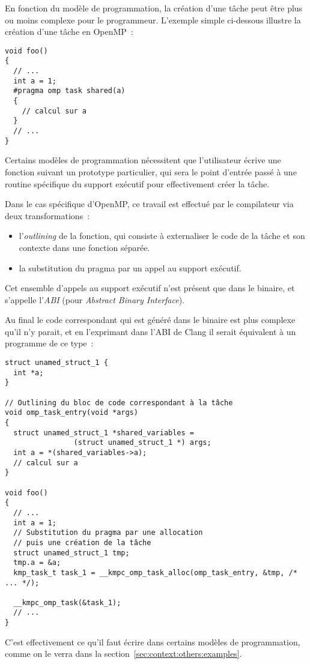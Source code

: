 En fonction du modèle de programmation, la création d'une tâche peut être plus ou moins complexe pour le programmeur.
L'exemple simple ci-dessous illustre la création d'une tâche en OpenMP~:
\begin{lstlisting}
void foo()
{
  // ...
  int a = 1;
  #pragma omp task shared(a)
  {
    // calcul sur a
  }
  // ...
}
\end{lstlisting}

Certains modèles de programmation nécessitent que l'utilisateur écrive une fonction suivant un prototype particulier, qui sera le point d'entrée passé à une routine spécifique du support exécutif pour effectivement créer la tâche.

Dans le cas spécifique d'OpenMP, ce travail est effectué par le compilateur via deux transformations~:
\begin{itemize}
  \item l'\emph{outlining} de la fonction, qui consiste à externaliser le code de la tâche et son contexte dans une fonction séparée.
  \item la substitution du pragma par un appel au support exécutif.
\end{itemize}

Cet ensemble d'appels au support exécutif n'est présent que dans le binaire, et s'appelle l'\emph{ABI} (pour \emph{Abstract Binary Interface}).

Au final le code correspondant qui est généré dans le binaire est plus complexe qu'il n'y parait, et en l'exprimant dans l'ABI de Clang il serait équivalent à un programme de ce type~:

\begin{lstlisting}
struct unamed_struct_1 {
  int *a;
}

// Outlining du bloc de code correspondant à la tâche
void omp_task_entry(void *args)
{
  struct unamed_struct_1 *shared_variables =
                (struct unamed_struct_1 *) args;
  int a = *(shared_variables->a);
  // calcul sur a
}

void foo()
{
  // ...
  int a = 1;
  // Substitution du pragma par une allocation
  // puis une création de la tâche
  struct unamed_struct_1 tmp;
  tmp.a = &a;
  kmp_task_t task_1 = __kmpc_omp_task_alloc(omp_task_entry, &tmp, /* ... */);

  __kmpc_omp_task(&task_1);
  // ...
}
\end{lstlisting}

C'est effectivement ce qu'il faut écrire dans certains modèles de programmation, comme on le verra dans la section~\ref{sec:context:others:examples}.


